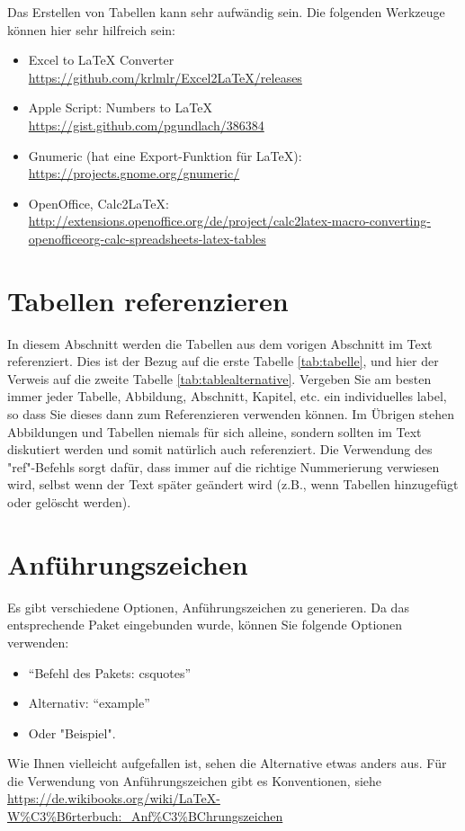 Das Erstellen von Tabellen kann sehr aufwändig sein. Die folgenden Werkzeuge können hier sehr hilfreich sein:

\begin{itemize}
	\item Excel to \LaTeX{} Converter\\ \url{https://github.com/krlmlr/Excel2LaTeX/releases}
	\item Apple Script: Numbers to \LaTeX{} \\ \url{https://gist.github.com/pgundlach/386384}
	\item Gnumeric (hat eine Export-Funktion für \LaTeX{}): \\ \url{https://projects.gnome.org/gnumeric/}
	\item OpenOffice, Calc2LaTeX: \url{http://extensions.openoffice.org/de/project/calc2latex-macro-converting-openofficeorg-calc-spreadsheets-latex-tables}
\end{itemize}

\section{Tabellen referenzieren}
\label{sec:tabellen_ref}
In diesem Abschnitt werden die Tabellen aus dem vorigen Abschnitt im Text referenziert. Dies ist der Bezug auf die erste Tabelle \ref{tab:tabelle}, und hier der Verweis auf die zweite Tabelle \ref{tab:tablealternative}. Vergeben Sie am besten immer jeder Tabelle, Abbildung, Abschnitt, Kapitel, etc. ein individuelles label, so dass Sie dieses dann zum Referenzieren verwenden können. Im Übrigen stehen Abbildungen und Tabellen niemals für sich alleine, sondern sollten im Text diskutiert werden und somit natürlich auch referenziert. Die Verwendung des "ref{}"-Befehls sorgt dafür, dass immer auf die richtige Nummerierung verwiesen wird, selbst wenn der Text später geändert wird (z.B., wenn Tabellen hinzugefügt oder gelöscht werden). 

\section{Anführungszeichen}
\label{sec:Anfuehrungszeichen}

Es gibt verschiedene Optionen, Anführungszeichen zu generieren. Da das entsprechende Paket eingebunden wurde, können Sie folgende Optionen verwenden:

\begin{itemize}
	\item \enquote{Befehl des Pakets: csquotes}
	\item Alternativ: ``example''
	\item Oder "Beispiel". 
\end{itemize}

Wie Ihnen vielleicht aufgefallen ist, sehen die Alternative etwas anders aus. Für die Verwendung von Anführungszeichen gibt es Konventionen, siehe \url{https://de.wikibooks.org/wiki/LaTeX-W%C3%B6rterbuch:_Anf%C3%BChrungszeichen}





